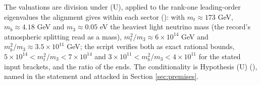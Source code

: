 The valuations are division under (U), applied to the rank-one leading-order eigenvalues the alignment gives within each sector (): with $m_{t} \approx 173$ GeV, $m_{b} \approx 4.18$ GeV and $m_{3} \approx 0.05$ eV the heaviest light neutrino mass (the record's atmospheric splitting read as a mass), $m_{t}^{2}/m_{3} \approx 6 \times 10^{14}$ GeV and $m_{b}^{2}/m_{3} \approx 3.5 \times 10^{11}$ GeV; the script verifies both as exact rational bounds, $5 \times 10^{14} < m_{t}^{2}/m_{3} < 7 \times 10^{14}$ and $3 \times 10^{11} < m_{b}^{2}/m_{3} < 4 \times 10^{11}$ for the stated input brackets, and the ratio of the ends. The conditionality is Hypothesis (U) (), named in the statement and attacked in Section \ref{sec:premises}.
